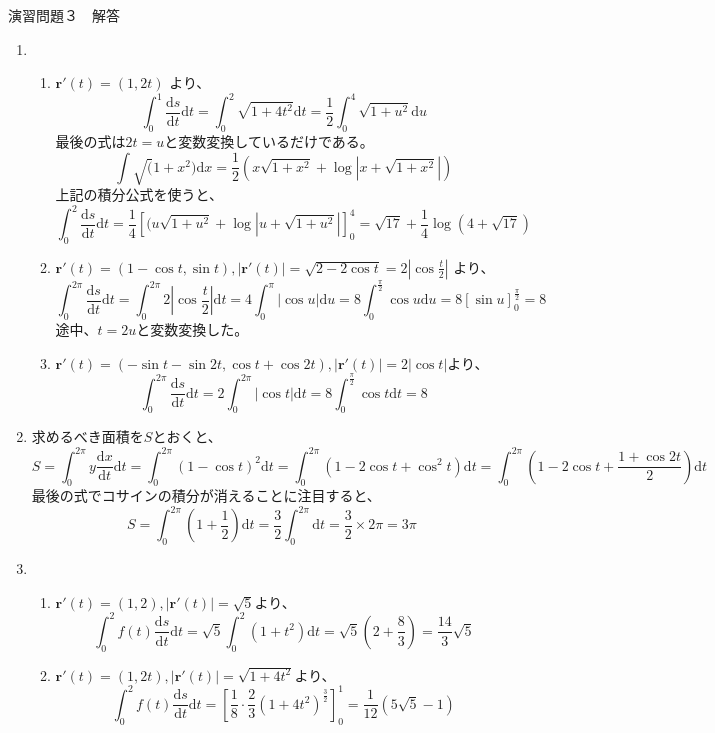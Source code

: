 \documentclass{jarticle}
\def\d{\mathrm d}
\begin{document}
\begin{center} {\Large 演習問題３　解答} \end{center}
\begin{enumerate}
  \item
    \begin{enumerate}
      \item
        $ \bm r' (t) = ( 1, 2t ) $ より、
        \[ \int_0^1 \frac{\d s}{\d t} \d t = \int_0^2 \sqrt{1+4t^2} \d t  = \frac{1}{2} \int_0^4 \sqrt{1+u^2} \d u \]
        最後の式は$2t = u$と変数変換しているだけである。
        \[ \int \sqrt(1+x^2) \d x = \frac{1}{2} (x \sqrt{1+x^2} + \log |x+\sqrt{1+x^2}|)\]
        上記の積分公式を使うと、
        \[ \int_0^2 \frac{\d s}{\d t} \d t = \frac{1}{4} \left[ (u \sqrt{1+u^2} + \log{|u+\sqrt{1+u^2}|} \right]^4_0 = \sqrt{17} + \frac{1}{4} \log{(4+\sqrt{17})} \]
      
      \item
        $ \bm r' (t) = ( 1-\cos t, \sin t ), |\bm r'(t)| = \sqrt{2-2\cos t} = 2 \left| \cos \frac{t}{2} \right|$ より、
        \[ \int_0^{2\pi} \frac{\d s}{\d t} \d t = \int_0^{2\pi} 2 | \cos \frac{t}{2} | \d t = 4 \int_0^\pi | \cos u | \d u = 8 \int_0^{\frac{\pi}{2}} \cos u \d u = 8 \left[ \sin u \right]_0^{\frac{\pi}{2}} = 8 \]
        途中、$t = 2u$と変数変換した。
      \item
        $ \bm r'(t)=(-\sin t - \sin 2t, \cos t + \cos 2t), |\bm r'(t)|=2| \cos t |$より、
        \[ \int_0^{2\pi} \frac{\d s}{\d t} \d t = 2 \int_0^{2\pi} |\cos t| \d t = 8 \int_0^{\frac{\pi}{2}} \cos t \d t = 8\]
    \end{enumerate}
    
  \item
    求めるべき面積を$S$とおくと、
    \[ S = \int_0^{2\pi} y \frac{\d x}{\d t} \d t = \int_0^{2\pi} (1-\cos t)^2 \d t = \int_0^{2\pi} ( 1 - 2 \cos t + \cos^2 t ) \d t = \int_0^{2\pi} ( 1 - 2 \cos t + \frac{1+\cos 2t}{2}) \d t \] 
    最後の式でコサインの積分が消えることに注目すると、
    \[ S = \int_0^{2\pi} ( 1 + \frac{1}{2} ) \d t = \frac{3}{2} \int_0^{2\pi} \d t = \frac{3}{2} \times 2 \pi = 3 \pi \]
  \item
    \begin{enumerate}
      \item
        $\bm r'(t) = (1,2), |\bm r'(t)| = \sqrt{5}$より、
        \[ \int_0^2 f(t) \frac{\d s}{\d t} \d t = \sqrt{5} \int_0^2 (1+t^2) \d t = \sqrt{5} (2 + \frac{8}{3}) = \frac{14}{3} \sqrt{5}\]
      \item
        $\bm r'(t) = (1,2t), |\bm r'(t)| = \sqrt{1+4t^2}$より、
        \[ \int_0^2 f(t) \frac{\d s}{\d t} \d t = \left[ \frac{1}{8} \cdot \frac{2}{3} (1+4t^2)^\frac{3}{2} \right]_0^1 = \frac{1}{12} ( 5\sqrt{5} - 1 ) \]
    \end{enumerate}
\end{enumerate}
\end{document}
